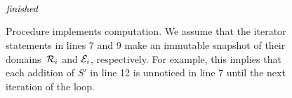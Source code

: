 \begin{figure}[t]
\begin{minipage}[t]{.94\columnwidth}
    \tabTT \algDone\\
    \tabT \algUntil $\mathit{finished}$\\
    \algEnd
  \end{minipage}
  \vspace{1ex}
  \linespread{1}
  \caption{Procedure \algAbstReachEnvSolve implements \aret
    computation.
We assume that the iterator statements in lines 7 and 9 make an
immutable snapshot of their domains~$\mathcal{R}_{i}$ and
$\mathcal{E}_{i}$, respectively. 
For example, this implies that each addition of $S'$ in line 12 is
unnoticed in line 7 until the next iteration of the \algRepeat
loop. 
}
  \label{fig-alg-abst-reach}
\end{figure}
